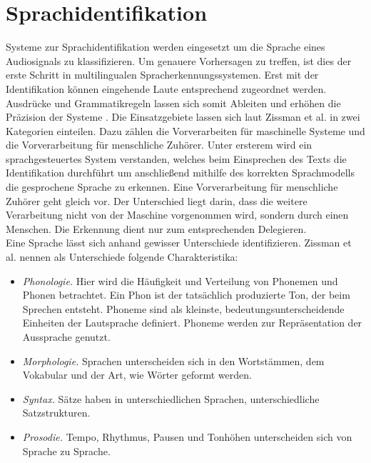 \section{Sprachidentifikation}
Systeme zur Sprachidentifikation werden eingesetzt um die Sprache eines Audiosignals zu klassifizieren. Um genauere Vorhersagen zu treffen, ist dies der erste Schritt in multilingualen Spracherkennungssystemen. Erst mit der Identifikation können eingehende Laute entsprechend zugeordnet werden. Ausdrücke und Grammatikregeln lassen sich somit Ableiten und erhöhen die Präzision der Systeme \cite{Bartz.2017}.
Die Einsatzgebiete lassen sich laut Zissman et al. \cite{Zissman.2001} in zwei Kategorien einteilen. Dazu zählen die Vorverarbeiten für maschinelle Systeme und die Vorverarbeitung für menschliche Zuhörer. Unter ersterem wird ein sprachgesteuertes System verstanden, welches beim Einsprechen des Texts die Identifikation durchführt um anschließend mithilfe des korrekten Sprachmodells die gesprochene Sprache zu erkennen. Eine Vorverarbeitung für menschliche Zuhörer geht gleich vor. Der Unterschied liegt darin, dass die weitere Verarbeitung nicht von der Maschine vorgenommen wird, sondern durch einen Menschen. Die Erkennung dient nur zum entsprechenden Delegieren.
\\
Eine Sprache lässt sich anhand gewisser Unterschiede identifizieren. Zissman et al. \cite{Zissman.2001} nennen als Unterschiede folgende Charakteristika:
\begin{itemize}
\item \textit{Phonologie.} Hier wird die Häufigkeit und Verteilung von Phonemen und Phonen betrachtet. Ein Phon ist der tatsächlich produzierte Ton, der beim Sprechen entsteht. Phoneme sind als kleinste, bedeutungsunterscheidende Einheiten der Lautsprache definiert. Phoneme werden zur Repräsentation der Aussprache genutzt.
\item \textit{Morphologie.} Sprachen unterscheiden sich in den Wortstämmen, dem Vokabular und der Art, wie Wörter geformt werden.
\item \textit{Syntax.} Sätze haben in unterschiedlichen Sprachen, unterschiedliche Satzstrukturen.
\item \textit{Prosodie.} Tempo, Rhythmus, Pausen und Tonhöhen unterscheiden sich von Sprache zu Sprache.
\end{itemize}

